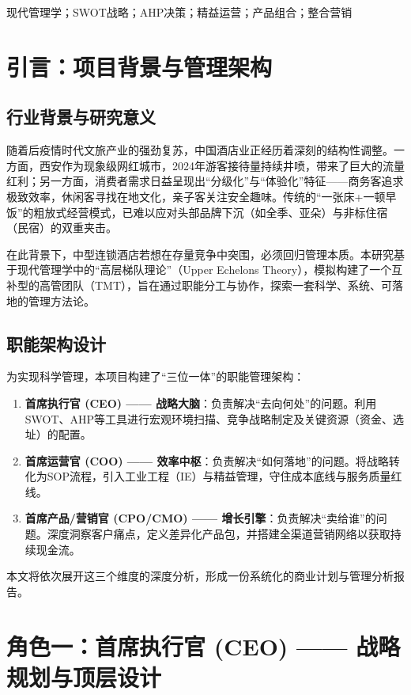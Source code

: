 \documentclass{cumcmthesis}
\begin{document}
\vspace{1cm}
 \songti {} 现代管理学；SWOT战略；AHP决策；精益运营；产品组合；整合营销

\newpage

\tableofcontents

\newpage


\section{引言：项目背景与管理架构}

\subsection{行业背景与研究意义}
随着后疫情时代文旅产业的强劲复苏，中国酒店业正经历着深刻的结构性调整。一方面，西安作为现象级网红城市，2024年游客接待量持续井喷，带来了巨大的流量红利；另一方面，消费者需求日益呈现出“分级化”与“体验化”特征——商务客追求极致效率，休闲客寻找在地文化，亲子客关注安全趣味。传统的“一张床+一顿早饭”的粗放式经营模式，已难以应对头部品牌下沉（如全季、亚朵）与非标住宿（民宿）的双重夹击。

在此背景下，中型连锁酒店若想在存量竞争中突围，必须回归管理本质。本研究基于现代管理学中的“高层梯队理论”（Upper Echelons Theory），模拟构建了一个互补型的高管团队（TMT），旨在通过职能分工与协作，探索一套科学、系统、可落地的管理方法论。

\subsection{职能架构设计}
为实现科学管理，本项目构建了“三位一体”的职能管理架构：
\begin{enumerate}
    \item \textbf{首席执行官 (CEO) —— 战略大脑}：负责解决“去向何处”的问题。利用SWOT、AHP等工具进行宏观环境扫描、竞争战略制定及关键资源（资金、选址）的配置。
    \item \textbf{首席运营官 (COO) —— 效率中枢}：负责解决“如何落地”的问题。将战略转化为SOP流程，引入工业工程（IE）与精益管理，守住成本底线与服务质量红线。
    \item \textbf{首席产品/营销官 (CPO/CMO) —— 增长引擎}：负责解决“卖给谁”的问题。深度洞察客户痛点，定义差异化产品包，并搭建全渠道营销网络以获取持续现金流。
\end{enumerate}

本文将依次展开这三个维度的深度分析，形成一份系统化的商业计划与管理分析报告。

\section{角色一：首席执行官 (CEO) —— 战略规划与顶层设计}
\end{document}
